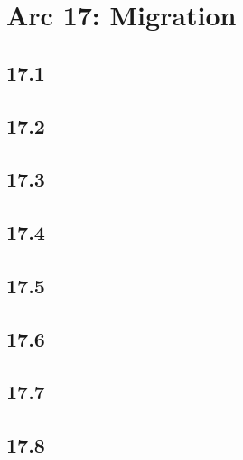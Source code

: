 \part{Arc 17: Migration}
 \chapter{17.1}
 \chapter{17.2}
 \chapter{17.3}
 \chapter{17.4}
 \chapter{17.5}
 \chapter{17.6}
 \chapter{17.7}
 \chapter{17.8}









